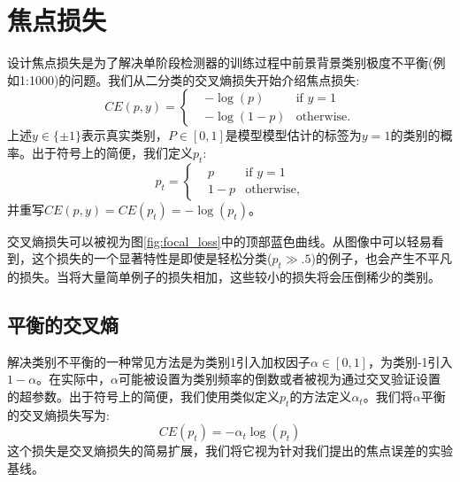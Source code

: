 \documentclass{ctexart}
\begin{document}
\section{焦点损失}
设计焦点损失是为了解决单阶段检测器的训练过程中前景背景类别极度不平衡(例如1:1000)的问题。我们从二分类的交叉熵损失开始介绍焦点损失:
\begin{equation}
    CE(p, y)=\left\{
    \begin{aligned}
         & -\log(p)   & \text{if }y=1     \\
         & -\log(1-p) & \text{otherwise.}
    \end{aligned}
    \right.
\end{equation}
上述$y\in \{ \pm 1 \}$表示真实类别，$P \in [0,1]$是模型模型估计的标签为$y=1$的类别的概率。出于符号上的简便，我们定义$p_t$:
\begin{equation}
    p_t = \left\{
    \begin{aligned}
         & p     & \text{if }y=1     \\
         & 1 - p & \text{otherwise,}
    \end{aligned}
    \right.
\end{equation}
并重写$CE(p, y)=CE(p_t)=-\log(p_t)$。\par
交叉熵损失可以被视为图\ref{fig:focal_loss}中的顶部蓝色曲线。从图像中可以轻易看到，这个损失的一个显著特性是即使是轻松分类($p_t\gg .5$)的例子，也会产生不平凡的损失。当将大量简单例子的损失相加，这些较小的损失将会压倒稀少的类别。\par
\subsection{平衡的交叉熵}
解决类别不平衡的一种常见方法是为类别1引入加权因子$\alpha \in [0, 1]$，为类别-1引入$1-\alpha$。在实际中，$\alpha$可能被设置为类别频率的倒数或者被视为通过交叉验证设置的超参数。出于符号上的简便，我们使用类似定义$p_t$的方法定义$\alpha_t$。我们将$\alpha$平衡的交叉熵损失写为:
\begin{equation}
    CE(p_t)=-\alpha_t\log(p_t)
\end{equation}
这个损失是交叉熵损失的简易扩展，我们将它视为针对我们提出的焦点误差的实验基线。
\end{document}
